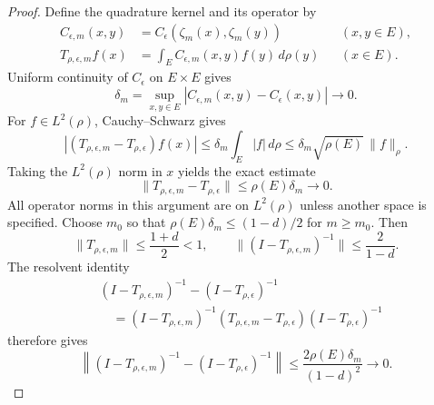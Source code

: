 \begin{proof}
Define the quadrature kernel and its operator by
\[
 \begin{aligned}
 C_{\epsilon,m}(x,y)&=C_\epsilon(\zeta_m(x),\zeta_m(y))
                         &&(x,y\in E),\\
 T_{\rho,\epsilon,m}f(x)&=\int_E C_{\epsilon,m}(x,y)f(y)\,d\rho(y)
                         &&(x\in E).
 \end{aligned}
\]
Uniform continuity of $C_\epsilon$ on $E\times E$ gives
\begin{equation}\label{eq:quadrature-kernel-convergence}
 \delta_m=\sup_{x,y\in E}
 |C_{\epsilon,m}(x,y)-C_\epsilon(x,y)|\longrightarrow0.
\end{equation}
For $f\in L^2(\rho)$, Cauchy--Schwarz gives
\[
 |(T_{\rho,\epsilon,m}-T_{\rho,\epsilon})f(x)|
 \le\delta_m\int_E|f|\,d\rho
 \le\delta_m\sqrt{\rho(E)}\,\|f\|_\rho.
\]
Taking the $L^2(\rho)$ norm in $x$ yields the exact estimate
\begin{equation}\label{eq:quadrature-operator-convergence}
 \|T_{\rho,\epsilon,m}-T_{\rho,\epsilon}\|
 \le\rho(E)\delta_m\longrightarrow0.
\end{equation}
All operator norms in this argument are on $L^2(\rho)$ unless
another space is specified. Choose $m_0$ so that
$\rho(E)\delta_m\le(1-d)/2$ for $m\ge m_0$. Then
\begin{equation}\label{eq:quadrature-inverse-bound}
 \|T_{\rho,\epsilon,m}\|\le\frac{1+d}{2}<1,
 \qquad
 \|(I-T_{\rho,\epsilon,m})^{-1}\|\le\frac2{1-d}.
\end{equation}
The resolvent identity
\[
 \begin{aligned}
 &(I-T_{\rho,\epsilon,m})^{-1}-(I-T_{\rho,\epsilon})^{-1}\\
 &\quad=(I-T_{\rho,\epsilon,m})^{-1}
 (T_{\rho,\epsilon,m}-T_{\rho,\epsilon})
 (I-T_{\rho,\epsilon})^{-1}
 \end{aligned}
\]
therefore gives
\begin{equation}\label{eq:quadrature-resolvent-convergence}
 \left\|(I-T_{\rho,\epsilon,m})^{-1}
             -(I-T_{\rho,\epsilon})^{-1}\right\|
 \le\frac{2\rho(E)\delta_m}{(1-d)^2}\longrightarrow0.
\end{equation}


\end{proof}
